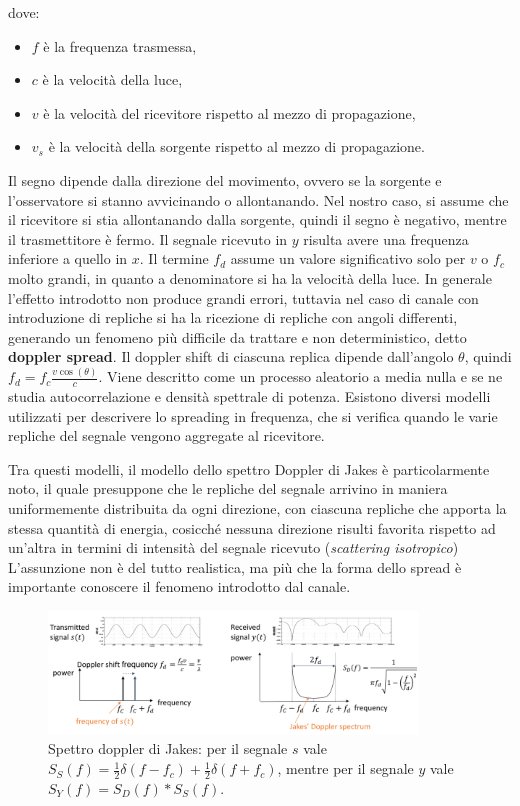 dove:
\begin{itemize}
    \item $f$ è la frequenza trasmessa,
    \item $c$ è la velocità della luce,
    \item $v$ è la velocità del ricevitore rispetto al mezzo di propagazione,
    \item $v_s$ è la velocità della sorgente rispetto al mezzo di propagazione.
\end{itemize}


Il segno dipende dalla direzione del movimento, ovvero se la sorgente e l'osservatore si stanno avvicinando o allontanando. 
Nel nostro caso, si assume che il ricevitore si stia allontanando dalla sorgente, quindi il segno è negativo, mentre il trasmettitore è fermo.
Il segnale ricevuto in $y$ risulta avere una frequenza inferiore a quello in $x$.
Il termine $f_d$ assume un valore significativo solo per $v$ o $f_c$ molto grandi, in quanto a denominatore si ha la velocità della luce.
In generale l'effetto introdotto non produce grandi errori, tuttavia nel caso di canale con introduzione di repliche si ha la ricezione di repliche con angoli differenti, generando un fenomeno più difficile da trattare e non deterministico, detto \textbf{doppler spread}.
Il doppler shift di ciascuna replica dipende dall'angolo $\theta$, quindi $f_d = f_c \frac{v \cos(\theta)}{c}$. 
Viene descritto come un processo aleatorio a media nulla e se ne studia autocorrelazione e densità spettrale di potenza.
Esistono diversi modelli utilizzati per descrivere lo spreading in frequenza,
che si verifica quando le varie repliche del segnale vengono aggregate al ricevitore.

Tra questi modelli, il modello dello spettro Doppler di Jakes è particolarmente noto, il quale presuppone che le repliche del segnale arrivino in maniera uniformemente distribuita da ogni direzione, con ciascuna repliche che apporta la stessa quantità di energia, cosicché nessuna direzione risulti favorita rispetto ad un'altra in termini di intensità del segnale ricevuto (\textit{scattering isotropico})
L'assunzione non è del tutto realistica, ma più che la forma dello spread è importante conoscere il fenomeno introdotto dal canale.

\begin{figure}[ht]
    \centering
    \includegraphics[width=0.875\textwidth]{imgs/jakes.jpg}
    \captionsetup{width=.5\textwidth}
    \caption*{Spettro doppler di Jakes:
        per il segnale $s$ vale \( S_S(f) = \frac{1}{2} \delta \left(f - f_c \right) + \frac{1}{2} \delta \left(f + f_c\right) \),
        mentre per il segnale $y$ vale \( S_Y(f) = S_D(f) \ast S_S(f) \).
    }
\end{figure}

